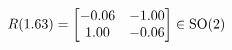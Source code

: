 \documentclass[preview]{standalone}
\begin{document}
\begin{align*}
\special{dvisvgm:raw <g id='unique000'>}R(1.63) = \begin{bmatrix} -0.06 & -1.00 \\ 1.00 & -0.06 \end{bmatrix} \in \text{SO}(2)\special{dvisvgm:raw </g>}
\end{align*}
\end{document}
